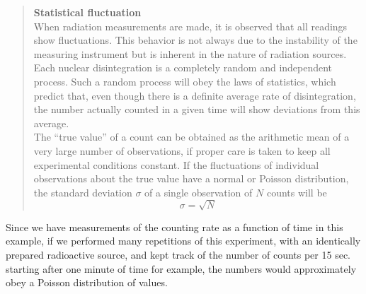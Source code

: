 \documentclass[12pt]{article}
\begin{document}
\begin{quote}
\textbf{Statistical fluctuation}\\
When radiation measurements are made, it is observed that all readings show fluctuations.
This behavior is not always due to the instability of the measuring instrument but is inherent
  in the nature of radiation sources.
Each nuclear disintegration is a completely random and independent process.
Such a random process will obey the laws of statistics, which predict that, even
  though there is a definite average rate of disintegration, the number actually counted 
   in a given time will show deviations from this average.\\

\noindent The ``true value'' of a count can be obtained as the arithmetic mean
  of a very large number of observations, if proper care is taken to keep all
   experimental conditions constant.
If the fluctuations of individual observations about the true value have a
   normal or Poisson distribution, the standard deviation $\sigma$ of a
   single observation of $N$ counts will be
\begin{equation}
  \sigma = \sqrt{N}
\end{equation}   
\end{quote}  
Since we have measurements of the counting rate as a function of time in this example,
  if we performed many repetitions of this experiment, with an identically prepared  radioactive
  source, and kept track of the number of counts per 15 sec. starting after one minute of time for example,
  the numbers would approximately obey a Poisson distribution of values.\\
\end{document}
